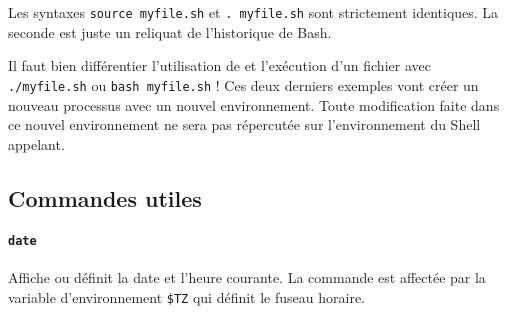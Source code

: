  Les syntaxes \texttt{source myfile.sh} et \texttt{. myfile.sh} sont strictement identiques. La seconde est juste un reliquat de l'historique de Bash.

 Il faut bien différentier l'utilisation de  et l'exécution d'un fichier avec \texttt{./myfile.sh} ou \texttt{bash myfile.sh} ! Ces deux derniers exemples vont créer un nouveau processus avec un nouvel environnement. Toute modification faite dans ce nouvel environnement ne sera pas répercutée sur l'environnement du Shell appelant.

\newpage
\subsection{Commandes utiles}
\vspace{-5mm}

\paragraph{\texttt{date}} 
Affiche ou définit la date et l'heure courante. La commande est affectée par la variable d'environnement \texttt{\$TZ} qui définit le fuseau horaire. 



